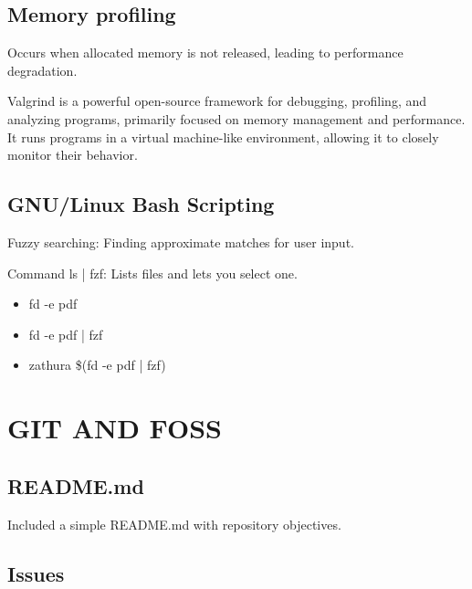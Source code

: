 \documentclass{article}
\begin{document}
\subsection{Memory profiling}

Occurs when allocated memory is not released, leading to performance degradation.

Valgrind is a powerful open-source framework for debugging, profiling, 
and analyzing programs, primarily focused on memory management and performance. 
It runs programs in a virtual machine-like environment, allowing it to closely monitor their behavior.

\subsection{GNU/Linux Bash Scripting}


Fuzzy searching: Finding approximate matches for user input.

Command ls | fzf: Lists files and lets you select one.
\begin{itemize}

\item fd -e pdf 

\item fd -e pdf | fzf  

\item zathura \$(fd -e pdf | fzf)
  \end{itemize}
\newpage

\section{GIT AND FOSS}

\subsection{README.md}

Included a simple README.md with repository objectives.

\subsection{Issues}
\end{document}
